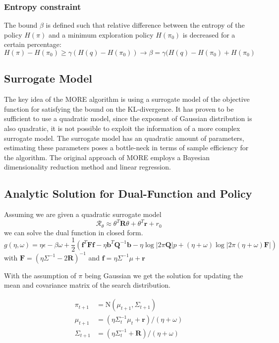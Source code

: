 \subsubsection{Entropy constraint}
The bound $\beta$ is defined such that relative difference between the entropy
of the policy $H(\pi)$ and a minimum exploration policy $H(\pi_0)$ is
decreased
for a certain percentage:
$$ H(\pi) - H(\pi_0) \geq \gamma (H(q) - H(\pi_0))
\rightarrow \beta = \gamma (H(q) - H(\pi_0) + H(\pi_0) $$

\subsection{Surrogate Model}
The key idea of the MORE algorithm is using a surrogate model
of the objective function
for satisfying the bound on the KL-divergence. It has proven to be
sufficient to use a quadratic model, since the exponent
of Gaussian distribution
is also quadratic, it is not possible to exploit the information of a more
complex surrogate model.
The surrogate model has an quadratic amount of parameters,
estimating these parameters poses a
bottle-neck in terms of sample efficiency for the algorithm.
The original approach of MORE employs a Bayesian dimensionality
reduction method and linear regression.

\subsection{Analytic Solution for Dual-Function and Policy}
Assuming we are given a quadratic surrogate model
$$ \mathcal{R}_\theta \approx \theta^T \mathbf{R} \theta + \theta^T \mathbf{r} + r_0 $$
we can solve the dual function in closed form.
$$ g(\eta, \omega) = \eta \epsilon - \beta \omega
+ \frac{1}{2} \left(\mathbf{f}^T \mathbf{F} \mathbf{f}
  - \eta \mathbf{b}^T \mathbf{Q}^{-1}
  \mathbf{b} - \eta \log |2\pi \mathbf{Q}|p
  + (\eta + \omega) \log |2\pi (\eta + \omega)
\mathbf{F}| \right) $$
with $\mathbf{F} = (\eta \Sigma^{-1} - 2 \mathbf{R})^{-1}$ and
$\mathbf{f} = \eta \Sigma^{-1} \mu + \mathbf{r}$

With the assumption of $\pi$ being Gaussian we
get the solution 
for updating the mean and covariance matrix
of the search distribution.

\begin{equation}
  \label{policy_update}
  \begin{aligned}
    \pi_{t+1} &= \text{N}(\mu_{t+1}, \Sigma_{t+1}) \\
    \mu_{t+1} &= (\eta \Sigma_{t}^{-1}\mu_t + \mathbf{r}) / (\eta + \omega) \\
    \Sigma_{t+1} &= (\eta \Sigma_t^{-1} + \mathbf{R}) / (\eta + \omega)
  \end{aligned}
\end{equation}

